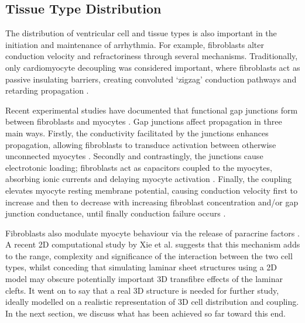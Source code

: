 
  \subsection{Tissue Type Distribution} %
  \label{sub:tissue_type_distribution}
    The distribution of ventricular cell and tissue types is also important in the initiation and maintenance of arrhythmia. For example, fibroblasts alter conduction velocity and refractoriness through several mechanisms. Traditionally, only cardiomyocyte decoupling was considered important, where fibroblasts act as passive insulating barriers, creating convoluted ‘zigzag’ conduction pathways and retarding propagation \cite{deBakker2006, Spach2007}.
  
    Recent experimental studies have documented that functional gap junctions form between fibroblasts and myocytes \cite{Camelliti2004, Camelliti2005, Walker2007}. Gap junctions affect propagation in three main ways.  Firstly, the conductivity facilitated by the junctions enhances propagation, allowing fibroblasts to transduce activation between otherwise unconnected myocytes \cite{Gaudesius2003, Zlochiver2008}. Secondly and contrastingly, the junctions cause electrotonic loading; fibroblasts act as capacitors coupled to the myocytes, absorbing ionic currents and delaying myocyte activation \cite{Jacquemet2007, Xie2009}. Finally, the coupling elevates myocyte resting membrane potential, causing conduction velocity first to increase and then to decrease with increasing fibroblast concentration and/or gap junction conductance, until finally conduction failure occurs \cite{Miragoli2006, Xie2009}.
  
    Fibroblasts also modulate myocyte behaviour via the release of paracrine factors \cite{Pedrotty2009}. A recent 2D computational study by Xie et al. \cite{Xie2009} suggests that this mechanism adds to the range, complexity and significance of the interaction between the two cell types, whilst conceding that simulating laminar sheet structures using a 2D model may obscure potentially important 3D transfibre effects of the laminar clefts. It went on to say that a real 3D structure is needed for further study, ideally modelled on a realistic representation of 3D cell distribution and coupling. In the next section, we discuss what has been achieved so far toward this end.

